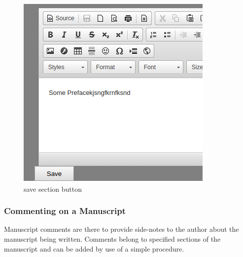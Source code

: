 \begin{itemize}
		\begin{figure}[h]
			\centering
			\includegraphics[scale=0.5]{images/SaveChanges.png}
			\caption{save section button}
		\end{figure} 
	\end{itemize}
	
\subsubsection{Commenting on a Manuscript}
Manuscript comments are there to provide side-notes to the author about the manuscript being written. Comments belong to specified sections of the manuscript and can be added by use of a simple procedure.

